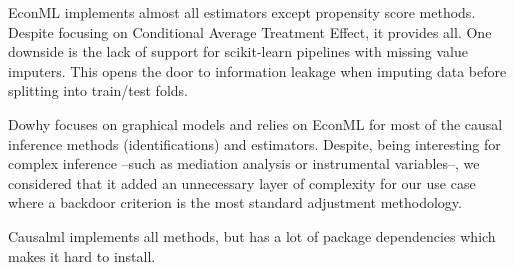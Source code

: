\documentclass[french,12pt,twoside,a4paper]{book}
\begin{document}
\begin{appendices}
  EconML implements almost all estimators except propensity score methods. Despite
  focusing on Conditional Average Treatment Effect, it provides all. One downside
  is the lack of support for scikit-learn pipelines with missing value imputers.
  This opens the door to information leakage when imputing data before splitting
  into train/test folds.

  Dowhy focuses on graphical models and relies on EconML for most of the causal
  inference methods (identifications) and estimators. Despite, being interesting
  for complex inference --such as mediation analysis or instrumental variables--,
  we considered that it added an unnecessary layer of complexity for our use case
  where a backdoor criterion is the most standard adjustment methodology.

  Causalml implements all methods, but has a lot of package dependencies
  which makes it hard to install.


\end{appendices}
\end{document}
